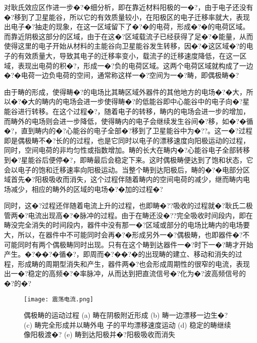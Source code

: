\documentclass{zjureport}
\begin{document}
 对耿氏效应区作进一步�?�细分析，即在靠近材料阳极的一�?，由于电子还没有�?移到了卫星能谷，所以它的有效质量较小，在阳极区的电子迁移率就大，表现出电子�?抽走的现象，在这一区域留下了�?�的电荷，形成�?�的电荷区域。而靠近阴极这部分的区域，由于在这�?区域载流子已经获得了足�?�能量，从而使得这里的电子开始从材料的主能谷向卫星能谷发生转移，因�?�这区域�?的电子的有效质量大，导致其电子的迁移率变小，载流子的迁移速度降低，在这一区域，表现出电荷的积�?，形成一�?负的电荷区域。这两个电荷区域就构成了一边�?�电荷一边负电荷的空间，通常称这样一�?空间为一�?畴，即偶极畴�?
 
 由于畴的形成，使得畴�?的电场比其畴区域外器件的其他地方的电场�?�大，所以�?�大的畴内的电场会进一步使得畴�?的低能谷即中心能谷中的电子向�?星能谷进行转移。在这个过程�?，随着电子的转移，畴内的电场会进一步的增加，而畴外的电场则会进一步降低，使得畴内的电子会继续发生谷间�?移，如�?�循�?，直到畴内的�?心能谷的电子全部�?移到了卫星能谷中为�??。这一�?过程即是偶极畴不�?长的的过程，也是它同时以电子的漂移速度向阳极运动的过程，同时，空间电荷的非均匀性或指数增加。畴的长大在畴内�?心能谷电子全部转移到�?星能谷后便停�?，即畴最后会稳定下来。这时偶极畴便达到了饱和状态，它会以电子的饱和迁移速率向阳极运动。当整个畴到达阳极后，畴的�?�电部分区域首先�?阳极吸收而消失，这个过程伴随着畴内的空间电荷的减少，继而畴内电场减少，相应的畴外的区域的电场�?�加的过程�?
 
 同时，这�?过程还伴随着电流上升的过程，也即畴�??吸收的过程就�?耿氏二极管两�?电流出现高�?�脉冲的过程。由于在畴还没�??完全吸收时间段内，即在畴没完全消失的时间段内，器件中没有那一�?区域或部分的电场比畴内的电场要大，所以，在器件中不可能同时会再�?�形成另外一�?偶极畴，也即器件�?不可能同时有两个偶极畴同时出现。只有在这个畴到达器件一�?时下一�?畴才开始产生。�?��?�循�?，即周而�?��?�的出现畴的建立、移动和消失的过程，形成畴的周期型消失和产生，器件两�?也会形成周期性的很窄的电流，表现出一�?稳定的高频�?�率脉冲，从而达到把直流信号�?化为�?波高频信号的�?的�?
 \begin{figure}[htbp]
	\centering
	\texttt{[image: 震荡电流.png]}
	\caption{偶极畴的运动过程 (a) 畴在阴极附近形成 (b) 畴一边漂移一边生�? (c) 畴完全形成并以畴外电
		子的平均漂移速度运动 (d) 稳定的畴继续像阳极渡�? (e) 畴到达阳极并�?阳极吸收而消失}
\end{figure}
\end{document}
